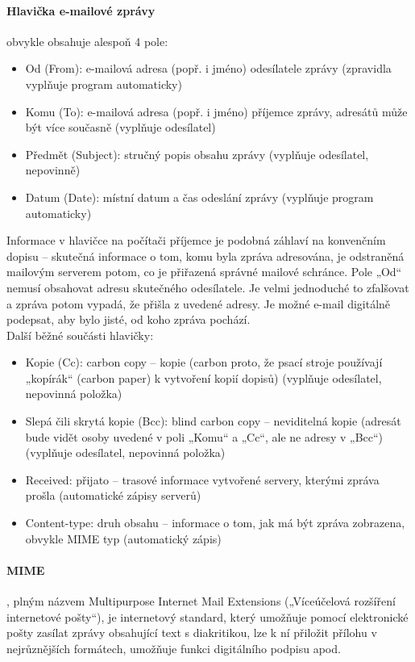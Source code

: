 \documentclass[10pt,a4paper]{article}
\begin{document}
\paragraph{Hlavička e-mailové zprávy} obvykle obsahuje alespoň 4 pole:
\begin{itemize}
	\item Od (From): e-mailová adresa (popř. i jméno) odesílatele zprávy (zpravidla vyplňuje program automaticky)
	\item Komu (To): e-mailová adresa (popř. i jméno) příjemce zprávy, adresátů může být více současně (vyplňuje odesílatel)
	\item Předmět (Subject): stručný popis obsahu zprávy (vyplňuje odesílatel, nepovinně)
	\item Datum (Date): místní datum a čas odeslání zprávy (vyplňuje program automaticky)
\end{itemize}
Informace v hlavičce na počítači příjemce je podobná záhlaví na konvenčním dopisu – skutečná informace o tom, komu byla zpráva adresována, je odstraněná mailovým serverem potom, co je přiřazená správné mailové schránce. Pole „Od“ nemusí obsahovat adresu skutečného odesílatele. Je velmi jednoduché to zfalšovat a zpráva potom vypadá, že přišla z uvedené adresy. Je možné e-mail digitálně podepsat, aby bylo jisté, od koho zpráva pochází. \\
Další běžné součásti hlavičky:
\begin{itemize}
	\item Kopie (Cc): carbon copy – kopie (carbon proto, že psací stroje používají „kopírák“ (carbon paper) k vytvoření kopií dopisů) (vyplňuje odesílatel, nepovinná položka)
	\item Slepá čili skrytá kopie (Bcc): blind carbon copy – neviditelná kopie (adresát bude vidět osoby uvedené v poli „Komu“ a „Cc“, ale ne adresy v „Bcc“) (vyplňuje odesílatel, nepovinná položka)
	\item Received: přijato – trasové informace vytvořené servery, kterými zpráva prošla (automatické zápisy serverů)
	\item Content-type: druh obsahu – informace o tom, jak má být zpráva zobrazena, obvykle MIME typ (automatický zápis)
\end{itemize}
\paragraph{MIME}, plným názvem Multipurpose Internet Mail Extensions („Víceúčelová rozšíření internetové pošty“), je internetový standard, který umožňuje pomocí elektronické pošty zasílat zprávy obsahující text s diakritikou, lze k ní přiložit přílohu v nejrůznějších formátech, umožňuje funkci digitálního podpisu apod.
\end{document}
